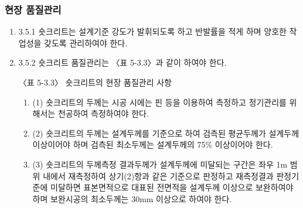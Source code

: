 \documentclass[12pt,a4paper]{article}
\begin{document}
\subsubsection{현장 품질관리}
\begin{enumerate}
\item  3.5.1 숏크리트는 설계기준 강도가 발휘되도록 하고 반발률을 적게 하며 양호한 작업성을 갖도록 관리하여야 한다.  
\item  3.5.2 숏크리트 품질관리는 〈표 5-3.3〉과 같이 하여야 한다.  
 
   
〈표 5-3.3〉 숏크리트의 현장 품질관리 사항
 
\begin{enumerate}
\item  (1) 숏크리트의 두께는 시공 시에는 핀 등을 이용하여 측정하고 정기관리를 위해서는 천공하여 측정하여야 한다. 
\item  (2) 숏크리트의 두께는 설계두께를 기준으로 하여 검측된 평균두께가 설계두께 이상이어야 하며 검측된 최소두께는 설계두께의 75\% 이상이어야 한다. 
\item  (3) 숏크리트의 두께측정 결과두께가 설계두께에 미달되는 구간은 좌우 1m 범위 내에서 재측정하여 상기(2)항과 같은 기준으로 판정하고 재측정결과 판정기준에 미달하면 표본면적으로 대표된 전면적을 설계두께 이상으로 보완하여야 하며 보완시공의 최소두께는 30mm 이상으로 하여야 한다. 
\end{enumerate}
 

\end{enumerate}
\end{document}
